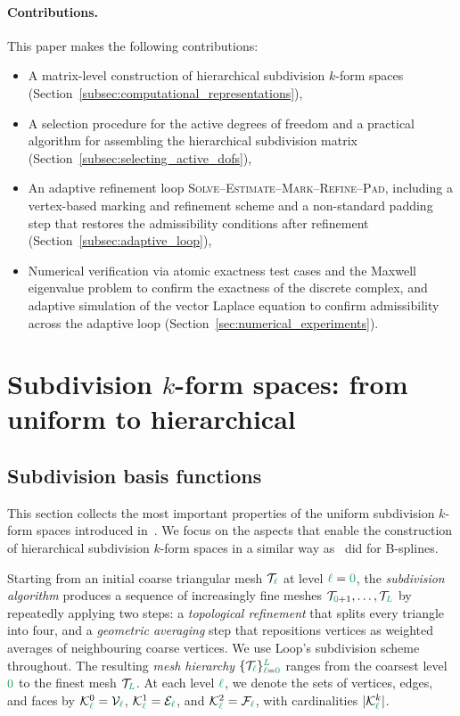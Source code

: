\documentclass[a4paper, 12pt]{article}
\newcommand{\green}{\color{ForestGreen}}
\newcommand{\T}{\mathcal{T}}
\newcommand{\K}{\mathcal{K}}
\newcommand{\V}{\mathcal{V}}
\newcommand{\E}{\mathcal{E}}
\newcommand{\F}{\mathcal{F}}
\renewcommand{\l}{{\green\ell}}
\renewcommand{\L}{{\green L}}
\newcommand{\lzero}{{\green 0}}
\theoremstyle{definition}
\theoremstyle{plain}
\numberwithin{equation}{section}
\begin{document}
\paragraph*{Contributions.} This paper makes the following contributions:
\begin{itemize}
    \item A matrix-level construction of hierarchical subdivision $k$-form spaces (Section~\ref{subsec:computational_representations}),
    \item A selection procedure for the active degrees of freedom and a practical algorithm for assembling the hierarchical subdivision matrix (Section~\ref{subsec:selecting_active_dofs}),
    \item An adaptive refinement loop \textsc{Solve}--\textsc{Estimate}--\textsc{Mark}--\textsc{Refine}--\textsc{Pad}, including a vertex-based marking and refinement scheme and a non-standard padding step that restores the admissibility conditions after refinement (Section~\ref{subsec:adaptive_loop}),
    \item Numerical verification via atomic exactness test cases and the Maxwell eigenvalue problem to confirm the exactness of the discrete complex, and adaptive simulation of the vector Laplace equation to confirm admissibility across the adaptive loop (Section~\ref{sec:numerical_experiments}).
\end{itemize}

\section{Subdivision $k$-form spaces: from uniform to hierarchical}

\subsection{Subdivision basis functions}
\label{subsec:subdiv_basis_functions}

This section collects the most important properties of the uniform subdivision $k$-form spaces introduced in~\cite{Piel.2026}. We focus on the aspects that enable the construction of hierarchical subdivision $k$-form spaces in a similar way as~\cite{Evans.2020} did for B-splines.

Starting from an initial coarse triangular mesh $\T_\l$ at level $\l = \lzero$, the \emph{subdivision algorithm} produces a sequence of increasingly fine meshes $\T_{\lzero+1}, \ldots, \T_\L$ by repeatedly applying two steps: a \emph{topological refinement} that splits every triangle into four, and a \emph{geometric averaging} step that repositions vertices as weighted averages of neighbouring coarse vertices. We use Loop's subdivision scheme~\cite{Loop.1987} throughout. The resulting \emph{mesh hierarchy} $\{\T_\l\}_{\l=\lzero}^{\L}$ ranges from the coarsest level $\lzero$ to the finest mesh $\T_\L$. At each level $\l$, we denote the sets of vertices, edges, and faces by $\K^0_\l = \V_\l$, $\K^1_\l = \E_\l$, and $\K^2_\l = \F_\l$, with cardinalities $|\K^k_\l|$.
\end{document}
